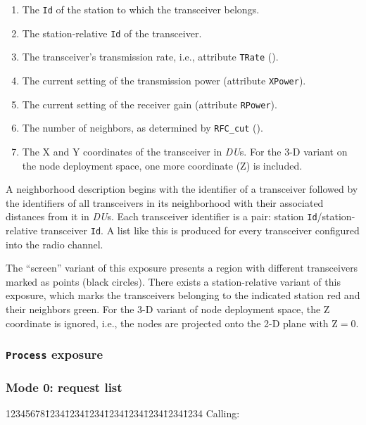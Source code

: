 \begin{enumerate}
\item
The {\tt Id} of the station to which the transceiver belongs.
\item
The station-relative {\tt Id} of the transceiver.
\item
The transceiver's transmission rate, i.e., attribute {\tt TRate}
().
\item
The current setting of the transmission power (attribute {\tt XPower}).
\item
The current setting of the receiver gain (attribute {\tt RPower}).
\item
The number of neighbors, as determined by {\tt RFC\_cut} ().
\item
The X and Y coordinates of the transceiver in {\em DU\/}s.
For the 3-D variant on the node deployment space, one more coordinate (Z)
is included.
\end{enumerate}

A neighborhood description begins with the identifier of a transceiver
followed by
the identifiers of all transceivers in its neighborhood with their
associated distances from it in {\em DU\/}s.
Each transceiver identifier is a pair: station {\tt Id}/station-relative
transceiver {\tt Id}.
A list like this is produced for every
transceiver configured into the radio channel.

The ``screen'' variant of this exposure presents a region with different
transceivers marked as points (black circles).
There exists a station-relative variant of this exposure, which marks the
transceivers belonging to the indicated station red and their neighbors
green.
For the 3-D variant of node deployment space, the Z coordinate is ignored,
i.e., the nodes are projected onto the 2-D plane with Z$=0$.

\subsubsection{{\tt Process} exposure}
\label{rm_ex_se_pr}

\subsubsection*{Mode 0: request list}

{\tt\begin{tabbing}
12345678\=1234\=1234\=1234\=1234\=1234\=1234\=1234\=1234\kill
{\rm Calling:}
\end{tabbing}}

